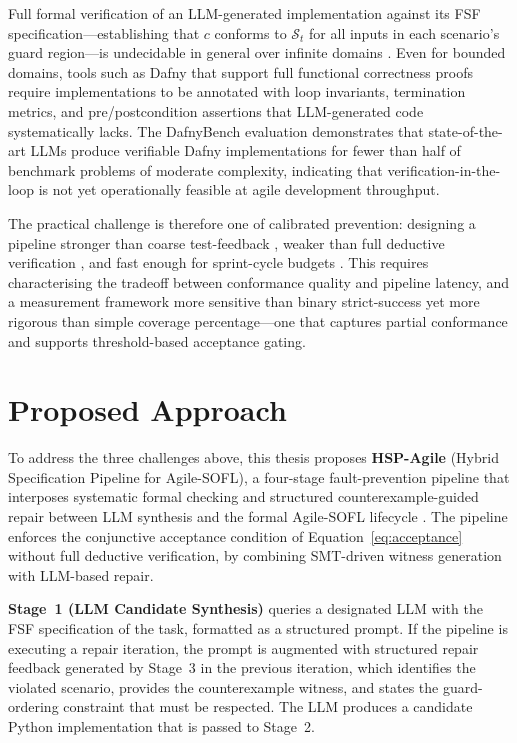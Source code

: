 Full formal verification of an LLM-generated implementation against its FSF specification—establishing that $c$ conforms to $\mathcal{S}_t$ for all inputs in each scenario's guard region—is undecidable in general over infinite domains \citep{back1998refinement}.  Even for bounded domains, tools such as Dafny \citep{leino2010dafny} that support full functional correctness proofs require implementations to be annotated with loop invariants, termination metrics, and pre/postcondition assertions that LLM-generated code systematically lacks.  The DafnyBench evaluation \citep{loughman2024dafnybench} demonstrates that state-of-the-art LLMs produce verifiable Dafny implementations for fewer than half of benchmark problems of moderate complexity, indicating that verification-in-the-loop is not yet operationally feasible at agile development throughput.

The practical challenge is therefore one of calibrated prevention: designing a pipeline stronger than coarse test-feedback \citep{chen2021codex}, weaker than full deductive verification \citep{leino2010dafny}, and fast enough for sprint-cycle budgets \citep{beck2001xp, li2022agilesofl}.  This requires characterising the tradeoff between conformance quality and pipeline latency, and a measurement framework more sensitive than binary strict-success yet more rigorous than simple coverage percentage---one that captures partial conformance and supports threshold-based acceptance gating.


\section{Proposed Approach}
\label{sec:intro:approach}

To address the three challenges above, this thesis proposes \textbf{HSP-Agile} (Hybrid Specification Pipeline for Agile-SOFL), a four-stage fault-prevention pipeline that interposes systematic formal checking and structured counterexample-guided repair between LLM synthesis and the formal Agile-SOFL lifecycle \citep{solarlezama2008sketching, li2023iet}.  The pipeline enforces the conjunctive acceptance condition of Equation~\eqref{eq:acceptance} without full deductive verification, by combining SMT-driven witness generation \citep{demoura2008z3} with LLM-based repair.

\textbf{Stage~1 (LLM Candidate Synthesis)} queries a designated LLM with the FSF specification of the task, formatted as a structured prompt.  If the pipeline is executing a repair iteration, the prompt is augmented with structured repair feedback generated by Stage~3 in the previous iteration, which identifies the violated scenario, provides the counterexample witness, and states the guard-ordering constraint that must be respected.  The LLM produces a candidate Python implementation that is passed to Stage~2.


